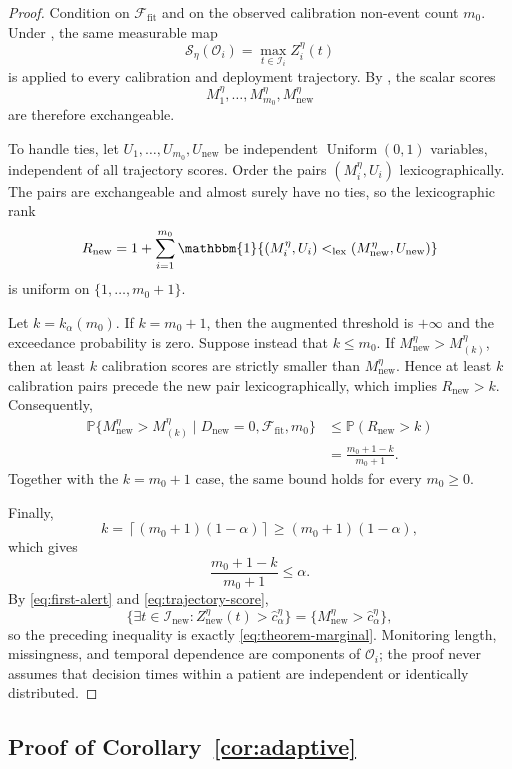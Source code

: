 \documentclass[11pt]{article}
\newcommand{\Pp}{\mathbb{P}}
\newcommand{\Ind}{\mathbbm{1}}
\newcommand{\calI}{\mathcal{I}}
\newcommand{\calF}{\mathcal{F}}
\begin{document}
\begin{proof}
Condition on $\calF_{\mathrm{fit}}$ and on the observed calibration non-event count $m_0$. Under , the same measurable map
\[
\mathcal S_{\eta}(\mathcal O_i)
=\max_{t\in\calI_i}Z_i^{\eta}(t)
\]
is applied to every calibration and deployment trajectory. By , the scalar scores
\[
M_1^{\eta},\ldots,M_{m_0}^{\eta},M_{\mathrm{new}}^{\eta}
\]
are therefore exchangeable.

To handle ties, let $U_1,\ldots,U_{m_0},U_{\mathrm{new}}$ be independent $\operatorname{Uniform}(0,1)$ variables, independent of all trajectory scores. Order the pairs $(M_i^{\eta},U_i)$ lexicographically. The pairs are exchangeable and almost surely have no ties, so the lexicographic rank
\[
R_{\mathrm{new}}
=1+\sum_{i=1}^{m_0}
\Ind\{(M_i^{\eta},U_i)<_{\mathrm{lex}}
(M_{\mathrm{new}}^{\eta},U_{\mathrm{new}})\}
\]
is uniform on $\{1,\ldots,m_0+1\}$.

Let $k=k_{\alpha}(m_0)$. If $k=m_0+1$, then the augmented threshold is $+\infty$ and the exceedance probability is zero. Suppose instead that $k\le m_0$. If $M_{\mathrm{new}}^{\eta}>M_{(k)}^{\eta}$, then at least $k$ calibration scores are strictly smaller than $M_{\mathrm{new}}^{\eta}$. Hence at least $k$ calibration pairs precede the new pair lexicographically, which implies $R_{\mathrm{new}}>k$. Consequently,
\begin{align*}
\Pp\{M_{\mathrm{new}}^{\eta}>M_{(k)}^{\eta}
\mid D_{\mathrm{new}}=0,\calF_{\mathrm{fit}},m_0\}
&\le \Pp(R_{\mathrm{new}}>k)\\
&=\frac{m_0+1-k}{m_0+1}.
\end{align*}
Together with the $k=m_0+1$ case, the same bound holds for every $m_0\ge0$.

Finally,
\[
k=\left\lceil(m_0+1)(1-\alpha)\right\rceil
\ge(m_0+1)(1-\alpha),
\]
which gives
\[
\frac{m_0+1-k}{m_0+1}\le\alpha.
\]
By \eqref{eq:first-alert} and \eqref{eq:trajectory-score},
\[
\{\exists t\in\calI_{\mathrm{new}}:
Z_{\mathrm{new}}^{\eta}(t)>\widehat c_{\alpha}^{\eta}\}
=\{M_{\mathrm{new}}^{\eta}>\widehat c_{\alpha}^{\eta}\},
\]
so the preceding inequality is exactly \eqref{eq:theorem-marginal}. Monitoring length, missingness, and temporal dependence are components of $\mathcal O_i$; the proof never assumes that decision times within a patient are independent or identically distributed.
\end{proof}

\subsection{Proof of Corollary~\ref{cor:adaptive}}
\end{document}

